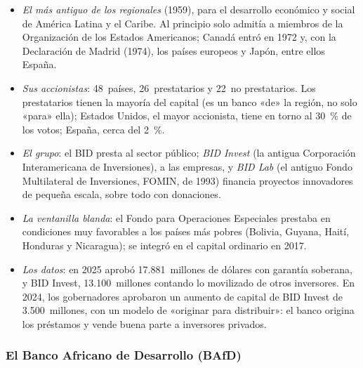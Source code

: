 \documentclass[11pt]{article}
\begin{document}
\begin{itemize}
\item \emph{El más antiguo de los regionales} (1959), para el desarrollo económico y social de América Latina y el Caribe. Al principio solo admitía a miembros de la Organización de los Estados Americanos; Canadá entró en 1972 y, con la Declaración de Madrid (1974), los países europeos y Japón, entre ellos España.
\item \emph{Sus accionistas}: 48~países, 26~prestatarios y 22~no prestatarios. Los prestatarios tienen la mayoría del capital (es un banco «de» la región, no solo «para» ella); Estados Unidos, el mayor accionista, tiene en torno al 30~\% de los votos; España, cerca del 2~\%\nocite{Espana2024CapitalExigible}.
\item \emph{El grupo}: el BID presta al sector público; \emph{BID Invest} (la antigua Corporación Interamericana de Inversiones), a las empresas, y \emph{BID Lab} (el antiguo Fondo Multilateral de Inversiones, FOMIN, de 1993) financia proyectos innovadores de pequeña escala, sobre todo con donaciones.
\item \emph{La ventanilla blanda}: el Fondo para Operaciones Especiales prestaba en condiciones muy favorables a los países más pobres (Bolivia, Guyana, Haití, Honduras y Nicaragua); se integró en el capital ordinario en 2017.
\item \emph{Los datos}: en 2025 aprobó 17.881~millones de dólares con garantía soberana, y BID Invest, 13.100~millones contando lo movilizado de otros inversores\nocite{BID2026Negocio}. En 2024, los gobernadores aprobaron un aumento de capital de BID Invest de 3.500~millones, con un modelo de «originar para distribuir»: el banco origina los préstamos y vende buena parte a inversores privados\nocite{BID2024Aumento}.
\end{itemize}

\subsubsection{El Banco Africano de Desarrollo (BAfD)}\label{sec:bafd}
\end{document}

